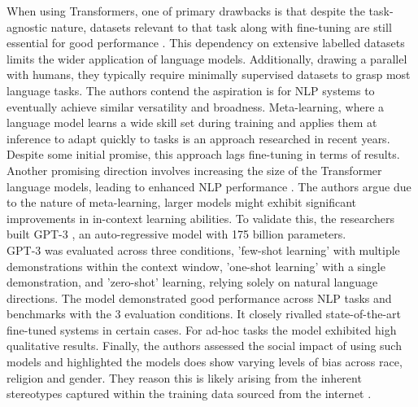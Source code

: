 When using Transformers, one of primary drawbacks is that despite the task-agnostic nature, datasets relevant to that task along with fine-tuning are still essential for good performance \cite{brownLanguageModelsAre2020}. This dependency on extensive labelled datasets limits the wider application of language models. Additionally, drawing a parallel with humans, they typically require minimally supervised datasets to grasp most language tasks. The authors contend the aspiration is for NLP systems to eventually achieve similar versatility and broadness. Meta-learning, where a language model learns a wide skill set during training and applies them at inference to adapt quickly to tasks is an approach researched in recent years. Despite some initial promise, this approach lags fine-tuning in terms of results. Another promising direction involves increasing the size of the Transformer language models, leading to enhanced NLP performance \cite{brownLanguageModelsAre2020}. The authors argue due to the nature of meta-learning, larger models might exhibit significant improvements in in-context learning abilities. To validate this, the researchers built GPT-3 \cite{brownLanguageModelsAre2020}, an auto-regressive model with 175 billion parameters.\\

GPT-3 was evaluated across three conditions, 'few-shot learning' with multiple demonstrations within the context window, 'one-shot learning' with a single demonstration, and 'zero-shot' learning, relying solely on natural language directions. The model demonstrated good performance across NLP tasks and benchmarks with the 3 evaluation conditions. It closely rivalled state-of-the-art fine-tuned systems in certain cases. For ad-hoc tasks the model exhibited high qualitative results. Finally, the authors assessed the social impact of using such models and highlighted the models does show varying levels of bias across race, religion and gender. They reason this is likely arising from the inherent stereotypes captured within the training data sourced from the internet \cite{brownLanguageModelsAre2020}.\\

